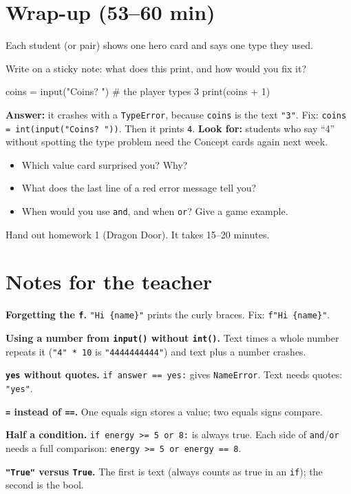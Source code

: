 \section{Wrap-up (53--60 min)}
Each student (or pair) shows one hero card and says one type they used.

\begin{formativecheck}
Write on a sticky note: what does this print, and how would you fix it?
\begin{pycode}
coins = input("Coins? ")     # the player types 3
print(coins + 1)
\end{pycode}
\textbf{Answer:} it crashes with a \texttt{TypeError}, because \texttt{coins} is the text \texttt{"3"}. Fix:
\texttt{coins = int(input("Coins? "))}. Then it prints \texttt{4}.
\textbf{Look for:} students who say \enquote{4} without spotting the type problem need the Concept cards again next week.
\end{formativecheck}

\begin{reflection}
\begin{itemize}[leftmargin=1.2em]
  \item Which value card surprised you? Why?
  \item What does the last line of a red error message tell you?
  \item When would you use \texttt{and}, and when \texttt{or}? Give a game example.
\end{itemize}
\end{reflection}
Hand out homework 1 (Dragon Door). It takes 15--20 minutes.

\section{Notes for the teacher}
\begin{commonmistakes}
  \item \textbf{Forgetting the \texttt{f}.} \texttt{"Hi \{name\}"} prints the curly braces. Fix: \texttt{f"Hi \{name\}"}.
  \item \textbf{Using a number from \texttt{input()} without \texttt{int()}.} Text times a whole number repeats it (\texttt{"4" * 10} is
        \texttt{"4444444444"}) and text plus a number crashes.
  \item \textbf{\texttt{yes} without quotes.} \texttt{if answer == yes:} gives \texttt{NameError}. Text needs quotes: \texttt{"yes"}.
  \item \textbf{\texttt{=} instead of \texttt{==}.} One equals sign stores a value; two equals signs compare.
  \item \textbf{Half a condition.} \texttt{if energy >= 5 or 8:} is always true. Each side of \texttt{and}/\texttt{or} needs a full comparison:
        \texttt{energy >= 5 or energy == 8}.
  \item \textbf{\texttt{"True"} versus \texttt{True}.} The first is text (always counts as true in an \texttt{if}); the second is the bool.
\end{commonmistakes}

